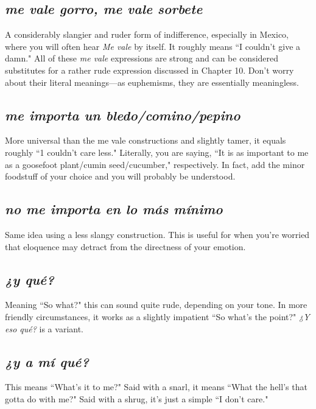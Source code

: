 \subsection{\emph{me vale gorro, me vale sorbete}}

A considerably slangier and ruder form of indifference, especially in Mexico, where you will often hear \emph{Me vale} by itself. It
roughly means ``I couldn't give a damn." All of these \emph{me vale} expressions are strong and can be considered substitutes for a rather rude
expression discussed in Chapter 10. Don't worry about their literal meanings---as euphemisms, they are essentially meaningless.

\subsection{\emph{me importa un bledo/comino/pepino}}

More universal than the me vale constructions and slightly
tamer, it equals roughly ``1 couldn't care less." Literally, you are saying,
``It is as important to me as a goosefoot plant/cumin seed/cucumber,"
respectively. In fact, add the minor foodstuff of your choice and you
will probably be understood.

\subsection{\emph{no me importa en lo más mínimo}}

Same idea using a less slangy construction. This is useful for
when you're worried that eloquence may detract from the directness of
your emotion.

\subsection{\emph{¿y qué?}}

Meaning ``So what?" this can sound quite rude, depending on
your tone. In more friendly circumstances, it works as a slightly impatient ``So what's the point?" \emph{¿Y eso qué?} is a variant.

\subsection{\emph{¿y a mí qué?}}

This means ``What's it to me?" Said with a snarl, it means
``What the hell's that gotta do with me?" Said with a shrug, it's just a
simple ``I don't care."

